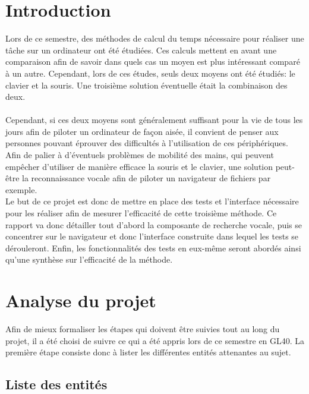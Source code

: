 \documentclass[a4paper, 11pt]{report}
\begin{document}
	\newpage
	
	
	
	\chapter*{Introduction}
	
	Lors de ce semestre, des méthodes de calcul du temps nécessaire pour réaliser une tâche sur un ordinateur ont été étudiées. Ces calculs mettent en avant une comparaison afin de savoir dans quels cas un moyen est plus intéressant comparé à un autre. Cependant, lors de ces études, seuls deux moyens ont été étudiés: le clavier et la souris. Une troisième solution éventuelle était la combinaison des deux.\\ \ \\
	Cependant, si ces deux moyens sont généralement suffisant pour la vie de tous les jours afin de piloter un ordinateur de façon aisée, il convient de penser aux personnes pouvant éprouver des difficultés à l'utilisation de ces périphériques. Afin de palier à d'éventuels problèmes de mobilité des mains, qui peuvent empêcher d'utiliser de manière efficace la souris et le clavier, une solution peut-être la reconnaissance vocale afin de piloter un navigateur de fichiers par exemple.\\
	Le but de ce projet est donc de mettre en place des tests et l'interface nécessaire pour les réaliser afin de mesurer l'efficacité de cette troisième méthode. Ce rapport va donc détailler tout d'abord la composante de recherche vocale, puis se concentrer sur le navigateur et donc l'interface construite dans lequel les tests se dérouleront. Enfin, les fonctionnalités des tests en eux-même seront abordés ainsi qu'une synthèse sur l'efficacité de la méthode.
	
	\chapter{Analyse du projet}
	
	Afin de mieux formaliser les étapes qui doivent \^etre suivies tout au long du projet, il a été choisi de suivre ce qui a été appris lors de ce semestre en GL40. La première étape consiste donc à lister les différentes entités attenantes au sujet.\\
	
		\section{Liste des entités}
		
\end{document}
